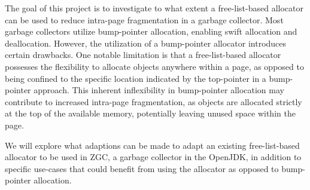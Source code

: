 
The goal of this project is to investigate to what extent a free-list-based allocator can be used to reduce intra-page fragmentation in a garbage collector. Most garbage collectors utilize bump-pointer allocation, enabling swift allocation and deallocation. However, the utilization of a bump-pointer allocator introduces certain drawbacks. One notable limitation is that a free-list-based allocator possesses the flexibility to allocate objects anywhere within a page, as opposed to being confined to the specific location indicated by the top-pointer in a bump-pointer approach. This inherent inflexibility in bump-pointer allocation may contribute to increased intra-page fragmentation, as objects are allocated strictly at the top of the available memory, potentially leaving unused space within the page.

We will explore what adaptions can be made to adapt an existing free-list-based allocator to be used in ZGC, a garbage collector in the OpenJDK, in addition to specific use-cases that could benefit from using the allocator as opposed to bump-pointer allocation.

